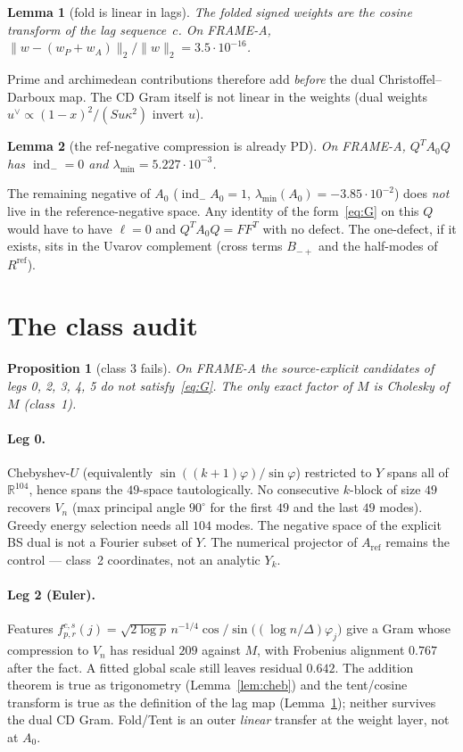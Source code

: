 \documentclass[11pt]{article}
\newtheorem{lemma}{Lemma}
\newtheorem{prop}{Proposition}
\theoremstyle{remark}
\newcommand{\indm}{\operatorname{ind}_{-}}
\begin{document}
\begin{lemma}[fold is linear in lags]\label{lem:fold}
The folded signed weights are the cosine transform of the
lag sequence~$c$.
On FRAME-A, $\|w-(w_P+w_A)\|_2/\|w\|_2=3.5\cdot 10^{-16}$.
\end{lemma}

Prime and archimedean contributions therefore add
\emph{before} the dual Christoffel--Darboux map.
The CD Gram itself is not linear in the weights
(dual weights $u^\vee\propto(1-x)^2/(Su\kappa^2)$ invert $u$).

\begin{lemma}[the ref-negative compression is already PD]\label{lem:qa0}
On FRAME-A, $Q^T A_0 Q$ has $\indm=0$ and
$\lambda_{\min}=5.227\cdot 10^{-3}$.
\end{lemma}

The remaining negative of $A_0$
($\indm A_0=1$, $\lambda_{\min}(A_0)=-3.85\cdot 10^{-2}$)
does \emph{not} live in the reference-negative space.
Any identity of the form~\eqref{eq:G} on this $Q$ would have
to have $\ell=0$ and $Q^T A_0 Q=FF^T$ with no defect.
The one-defect, if it exists, sits in the Uvarov complement
(cross terms $B_{-+}$ and the half-modes of $R^{\mathrm{ref}}$).

\section{The class audit}\label{sec:audit}

\begin{prop}[class 3 fails]\label{prop:class}
On FRAME-A the source-explicit candidates of legs 0, 2, 3, 4, 5
do not satisfy~\eqref{eq:G}.
The only exact factor of $M$ is Cholesky of $M$
(class~1).
\end{prop}

\paragraph{Leg 0.}
Chebyshev-$U$ (equivalently $\sin((k+1)\varphi)/\sin\varphi$)
restricted to $Y$ spans all of $\mathbb{R}^{104}$, hence spans
the $49$-space tautologically.
No consecutive $k$-block of size $49$ recovers $V_n$
(max principal angle $90^\circ$ for the first $49$ and the last
$49$ modes).
Greedy energy selection needs all $104$ modes.
The negative space of the explicit BS dual is not a Fourier
subset of $Y$.
The numerical projector of $A_{\mathrm{ref}}$ remains the
control --- class~2 coordinates, not an analytic $Y_k$.

\paragraph{Leg 2 (Euler).}
Features
$f^{c,s}_{p,r}(j)=\sqrt{2\log p}\,n^{-1/4}\cos/\sin\bigl((\log n/\Delta)\varphi_j\bigr)$
give a Gram whose compression to $V_n$ has residual $209$
against $M$, with Frobenius alignment $0.767$ after the fact.
A fitted global scale still leaves residual $0.642$.
The addition theorem is true as trigonometry
(Lemma~\ref{lem:cheb}) and the tent/cosine transform is true
as the definition of the lag map (Lemma~\ref{lem:fold});
neither survives the dual CD Gram.
Fold/Tent is an outer \emph{linear} transfer at the weight
layer, not at $A_0$.
\end{document}

